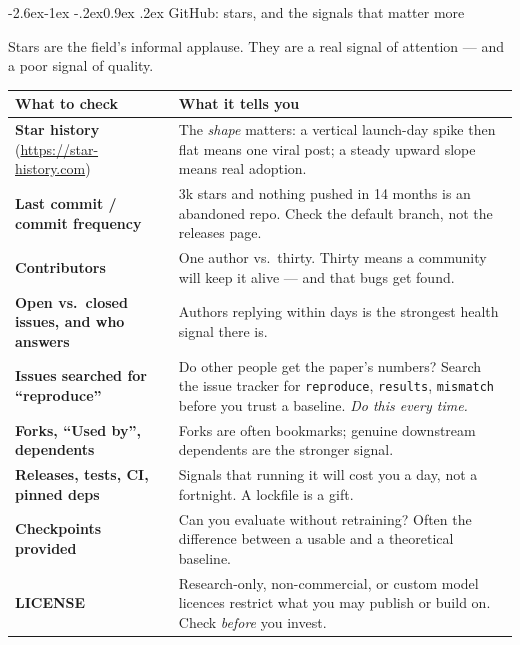 \documentclass[11pt,a4paper]{article}
\makeatletter
\renewcommand\subsection{\@startsection{subsection}{2}{\z@}%
  {-2.6ex\@plus -1ex \@minus -.2ex}{0.9ex \@plus .2ex}%
  {\normalfont\large\bfseries\color{brandlight}}}
\newcommand{\thead}[1]{\textbf{\color{brand}#1}}
\newcommand{\code}[1]{\texttt{\small #1}}
\makeatother
\begin{document}
\subsection{GitHub: stars, and the signals that matter more}

Stars are the field's informal applause. They are a real signal of attention
--- and a poor signal of quality.

\begin{table}[h]
\centering
\small
\begin{tabularx}{\textwidth}{L{4.6cm} X}
\toprule
\thead{What to check} & \thead{What it tells you} \\
\midrule
{}
\textbf{Star history} (\url{https://star-history.com}) & The \emph{shape}
matters: a vertical launch-day spike then flat means one viral post; a steady
upward slope means real adoption. \\
\textbf{Last commit / commit frequency} & 3k stars and nothing pushed in
14 months is an abandoned repo. Check the default branch, not the releases
page. \\
\textbf{Contributors} & One author vs.\ thirty. Thirty means a community will
keep it alive --- and that bugs get found. \\
\textbf{Open vs.\ closed issues, and who answers} & Authors replying within
days is the strongest health signal there is. \\
\textbf{Issues searched for ``reproduce''} & Do other people get the paper's
numbers? Search the issue tracker for \code{reproduce}, \code{results},
\code{mismatch} before you trust a baseline. \emph{Do this every time.} \\
\textbf{Forks, ``Used by'', dependents} & Forks are often bookmarks; genuine
downstream dependents are the stronger signal. \\
\textbf{Releases, tests, CI, pinned deps} & Signals that running it will cost
you a day, not a fortnight. A lockfile is a gift. \\
\textbf{Checkpoints provided} & Can you evaluate without retraining? Often the
difference between a usable and a theoretical baseline. \\
\textbf{LICENSE} & Research-only, non-commercial, or custom model licences
restrict what you may publish or build on. Check \emph{before} you invest. \\
\bottomrule
\end{tabularx}
\end{table}
\end{document}
